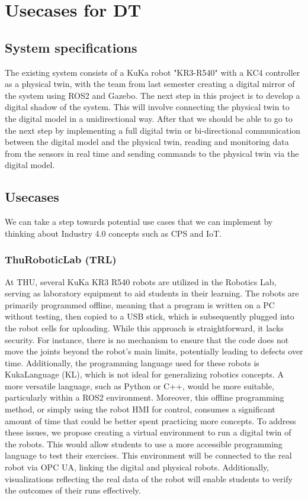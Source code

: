 \section{Usecases for DT}

\subsection{System specifications}

The existing system consists of a KuKa robot "KR3-R540" with a KC4 controller as a physical twin, with the team from last semester creating a digital mirror of the system using ROS2 and Gazebo.
The next step in this project is to develop a digital shadow of the system. This will involve connecting the physical twin to the digital model in a unidirectional way.
After that we should be able to go to the next step by implementing a full digital twin or bi-directional communication between the digital model and the physical twin, 
reading and monitoring data from the sensors in real time and sending commands to the physical twin via the digital model. 

\subsection{Usecases}

We can take a step towards potential use cases that we can implement by thinking about Industry 4.0 concepts such as CPS and IoT.

\subsubsection{ThuRoboticLab (TRL)}
At THU, several KuKa KR3 R540 robots are utilized in the Robotics Lab, 
serving as laboratory equipment to aid students in their learning. 
The robots are primarily programmed offline, 
meaning that a program is written on a PC without testing, 
then copied to a USB stick, 
which is subsequently plugged into the robot cells for uploading.
While this approach is straightforward, 
it lacks security. For instance, 
there is no mechanism to ensure that the code does not move the joints beyond 
the robot's main limits, potentially leading to defects over time. Additionally, 
the programming language used for these robots is KukaLanguage (KL), 
which is not ideal for generalizing robotics concepts. 
A more versatile language, such as Python or C++, would be more suitable, 
particularly within a ROS2 environment.
Moreover, this offline programming method, 
or simply using the robot HMI for control, consumes a significant amount of time 
that could be better spent practicing more concepts.
To address these issues, 
we propose creating a virtual environment to run a digital twin of the robots. 
This would allow students to use a more accessible programming language to test 
their exercises. This environment will be connected to the real robot via OPC UA, 
linking the digital and physical robots. Additionally, 
visualizations reflecting the real data of the robot will enable students to 
verify the outcomes of their runs effectively.